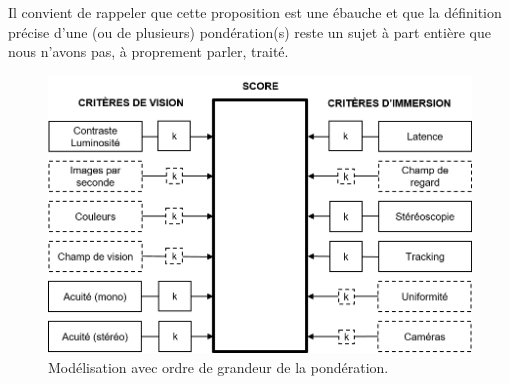 \par Il convient de rappeler que cette proposition est une ébauche et que la définition précise d'une (ou de plusieurs) pondération(s) reste un sujet à part entière que nous n'avons pas, à proprement parler, traité.

\begin{figure}
	\centering
	\includegraphics[scale=1]{Figures/ModeleDefinitifPondere_2}
	\caption{Modélisation avec ordre de grandeur de la pondération.}
	\label{fig:modèle_définitif_pondere}
\end{figure}